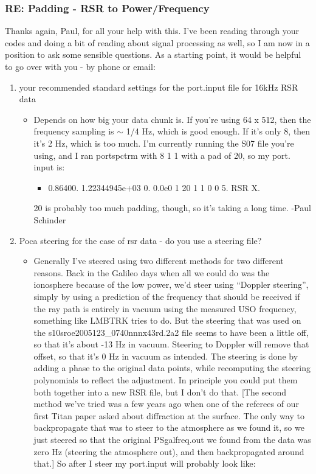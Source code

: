 \documentclass[crop=false,class=book]{standalone}
\begin{document}
\subsubsection{\footnotesize RE: Padding - RSR to Power/Frequency}
Thanks again, Paul, for all your help with this. I've been reading through your codes and doing a bit of reading about signal processing as well, so I am now in a position to ask some sensible questions. As a starting point, it would be helpful to go over with you - by phone or email:
\begin{enumerate}
    \item your recommended standard settings for the port.input file for 16kHz RSR data
    \begin{itemize}
        \item Depends on how big your data chunk is. If you’re using 64 x 512, then the frequency sampling is $\sim$ 1/4 Hz, which is good enough.  If it’s only 8, then it’s 2 Hz, which is too much. I’m currently running the S07 file you’re using, and I ran portspctrm with 8 1 1 with a pad of 20, so my port. input is:
        \begin{itemize}
            \item 0.86400. 1.22344945e+03 0. 0.0e0 1 20 1 1 0 0 5. RSR X.
        \end{itemize}
        20 is probably too much padding, though, so it’s taking a long time. -Paul Schinder
    \end{itemize}
    \item  Poca steering for the case of rsr data - do you use a steering file?
    \begin{itemize}
        \item Generally I’ve steered using two different methods for two different reasons.  Back in the Galileo days when all we could do was the ionosphere because of the low power, we’d steer using “Doppler steering”, simply by using a prediction of the frequency that should be received if the ray path is entirely in vacuum using the measured USO frequency, something like LMBTRK tries to do.  But the steering that was used on the s10sroe2005123\_0740nnnx43rd.2a2 file seems to have been a little off, so that it's about -13 Hz in vacuum.  Steering to Doppler will remove that offset, so that it’s 0 Hz in vacuum as intended.  The steering is done by adding a phase to the original data points, while recomputing the steering polynomials to reflect the adjustment.  In principle you could put them both together into a new RSR file, but I don’t do that. [The second method we’ve tried was a few years ago when one of the referees of our first Titan paper asked about diffraction at the surface.  The only way to backpropagate that was to steer to the atmosphere as we found it, so we just steered so that the original PSgalfreq.out we found from the data was zero Hz (steering the atmosphere out), and then backpropagated around that.] So after I steer my port.input will probably look like:

\end{itemize}
\end{enumerate}
\end{document}
